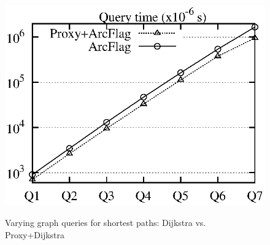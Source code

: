 {\begin{figure}[t!]
\begin{center}
{\includegraphics[scale=0.45]{./exp/query_eus_path_dj.eps}}
\hspace{-4ex}\vspace{-1.5ex}
\end{center}
\vspace{1ex}
\caption{Varying graph queries for shortest paths: Dijkstra vs. Proxy+Dijkstra}
\label{fig:performance_path_queries_dj}
\vspace{-1ex}
\end{figure}
}

